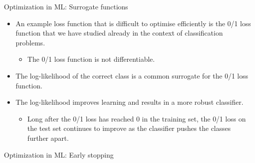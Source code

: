 \begin{frame}[t]{
    Optimization in ML: Surrogate functions}
    \begin{block}{}
        \begin{itemize}
            \scriptsize
            \item 
                An example \gls{loss function} that is difficult to
                optimise efficiently is the 
                \gls{0/1 loss function}
                that we have studied already in the context of
                \gls{classification} problems.
                \begin{itemize}
                    \scriptsize
                    \item 
                      The \gls{0/1 loss function} is not differentiable.
                \end{itemize}
                \item 
                The  
                \gls{log-likelihood} of the
                correct class is a common surrogate for 
                the \gls{0/1 loss function}.
                \item 
                The \gls{log-likelihood} improves
                learning and results in a more robust 
                \gls{classifier}.
                \begin{itemize}
                    \scriptsize
                    \item 
                      Long after the \gls{0/1 loss} has reached 0 in the 
                      \gls{training set},
                      the \gls{0/1 loss} on the 
                      \gls{test set} continues to improve
                      as the \gls{classifier} pushes the classes further apart.\\
                \end{itemize}
        \end{itemize}
    \end{block}

\end{frame}

%
%
%

\begin{frame}[t]{
    Optimization in ML: Early stopping}

   

\end{frame}